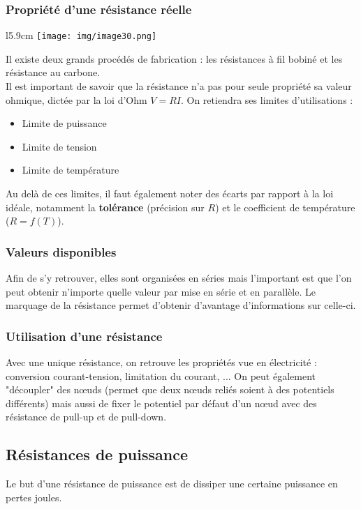 \subsubsection{Propriété d'une résistance réelle}
\begin{wrapfigure}[11]{l}{5.9cm}
	\texttt{[image: img/image30.png]}
\end{wrapfigure}
Il existe deux grands procédés de fabrication : les résistances à fil bobiné et les résistance au carbone.\\
Il est important de savoir que la résistance n'a pas pour seule propriété sa valeur ohmique, dictée par la loi d'Ohm $V = RI$. On retiendra ses limites d'utilisations :
\begin{itemize}
	\item Limite de puissance
	\item Limite de tension
	\item Limite de température
\end{itemize}
Au delà de ces limites, il faut également noter des écarts par rapport à la loi idéale, notamment la \textbf{tolérance} (précision sur $R$) et le coefficient de température ($R = f(T)$).


\subsubsection{Valeurs disponibles}
Afin de s'y retrouver, elles sont organisées en séries mais l'important est que l'on peut obtenir n'importe quelle valeur par mise en série et en parallèle. Le marquage de la résistance permet d'obtenir d'avantage d'informations sur celle-ci.

\subsubsection{Utilisation d'une résistance}
Avec une unique résistance, on retrouve les propriétés vue en électricité : conversion courant-tension, limitation du courant,  ... On peut également "découpler" des nœuds (permet que deux nœuds reliés soient à des potentiels différents) mais aussi de fixer le potentiel par défaut d'un nœud avec des résistance de pull-up et de pull-down.


\subsection{Résistances de puissance}
Le but d'une résistance de puissance est de dissiper une certaine puissance en pertes joules.

